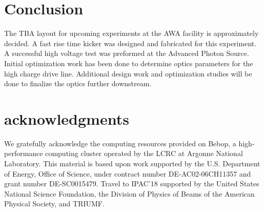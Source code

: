 \documentclass[letterpaper,  %
              ]{jacow-2_3}   %
\begin{document}
\section{Conclusion}
The TBA layout for upcoming experiments at the 
AWA facility is approximately decided. A fast rise time kicker
was designed and fabricated for this experiment. 
A successful high voltage test was preformed at the 
Advanced Photon Source. Initial optimization 
work has been done to determine
optics parameters for the high charge drive line.
Additional design work and optimization studies will be done 
to finalize the optics further downstream. 

\section{acknowledgments}
We gratefully acknowledge the computing resources
provided on Bebop, a high-performance computing cluster
operated by the LCRC at Argonne National Laboratory.
This material is based upon work supported by the 
U.S. Department of Energy, Office of Science, under 
contract number DE-AC02-06CH11357 and grant number DE-SC0015479. 
Travel to IPAC'18 supported by the United States National Science Foundation, 
the Division of Physics of Beams of the American Physical Society, and TRIUMF.
\end{document}

